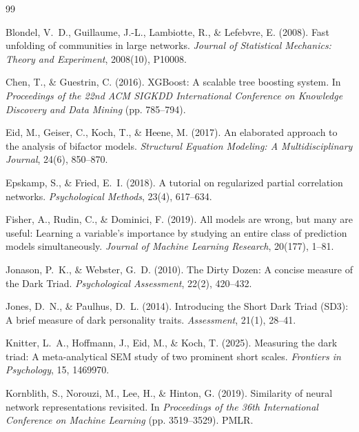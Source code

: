 \documentclass[11pt,twocolumn]{article}
\begin{document}
\clearpage

\begin{thebibliography}{99}
\footnotesize

Blondel, V.~D., Guillaume, J.-L., Lambiotte, R., \& Lefebvre, E. (2008). Fast unfolding of communities in large networks. \textit{Journal of Statistical Mechanics: Theory and Experiment}, 2008(10), P10008.

Chen, T., \& Guestrin, C. (2016). XGBoost: A scalable tree boosting system. In \textit{Proceedings of the 22nd ACM SIGKDD International Conference on Knowledge Discovery and Data Mining} (pp. 785--794).

Eid, M., Geiser, C., Koch, T., \& Heene, M. (2017). An elaborated approach to the analysis of bifactor models. \textit{Structural Equation Modeling: A Multidisciplinary Journal}, 24(6), 850--870.

Epskamp, S., \& Fried, E.~I. (2018). A tutorial on regularized partial correlation networks. \textit{Psychological Methods}, 23(4), 617--634.

Fisher, A., Rudin, C., \& Dominici, F. (2019). All models are wrong, but many are useful: Learning a variable's importance by studying an entire class of prediction models simultaneously. \textit{Journal of Machine Learning Research}, 20(177), 1--81.

Jonason, P.~K., \& Webster, G.~D. (2010). The Dirty Dozen: A concise measure of the Dark Triad. \textit{Psychological Assessment}, 22(2), 420--432.

Jones, D.~N., \& Paulhus, D.~L. (2014). Introducing the Short Dark Triad (SD3): A brief measure of dark personality traits. \textit{Assessment}, 21(1), 28--41.

Knitter, L.~A., Hoffmann, J., Eid, M., \& Koch, T. (2025). Measuring the dark triad: A meta-analytical SEM study of two prominent short scales. \textit{Frontiers in Psychology}, 15, 1469970.

Kornblith, S., Norouzi, M., Lee, H., \& Hinton, G. (2019). Similarity of neural network representations revisited. In \textit{Proceedings of the 36th International Conference on Machine Learning} (pp. 3519--3529). PMLR.


\end{thebibliography}
\end{document}
